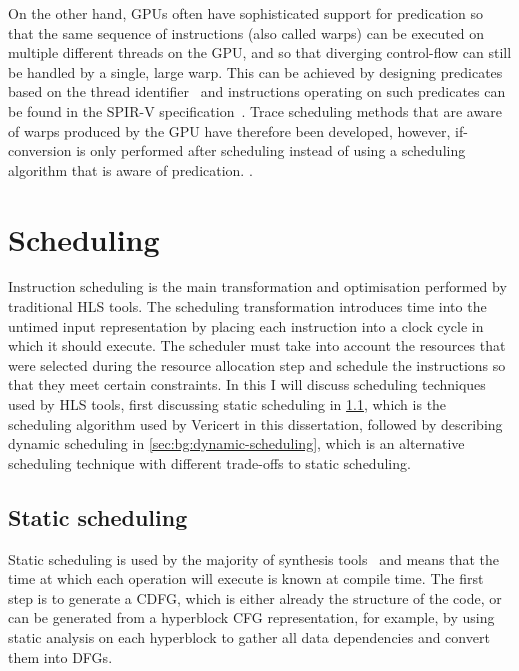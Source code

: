 On the other hand, \glspl{GPU} often have sophisticated support for predication so that the same sequence of instructions (also called warps) can be executed on multiple different threads on the \gls{GPU}, and so that diverging control-flow can still be handled by a single, large warp.
This can be achieved by designing predicates based on the thread identifier~\cite{narasiman11_igplw} and instructions operating on such predicates can be found in the SPIR-V specification~\cite[p.~172]{kessenich18_svs}.
Trace scheduling methods that are aware of warps produced by the \gls{GPU} have therefore been developed, however, if-conversion is only performed after scheduling instead of using a scheduling algorithm that is aware of predication.
.

\section{Scheduling}%
\label{sec:bg:scheduling}

Instruction scheduling is the main transformation and optimisation performed by
traditional \gls{HLS} tools.  The scheduling transformation introduces time into
the untimed input representation by placing each instruction into a clock cycle
in which it should execute.  The scheduler must take into account the resources
that were selected during the resource allocation step and schedule the
instructions so that they meet certain constraints.  In this
 I will discuss scheduling techniques used by
\gls{HLS} tools, first discussing static scheduling in
\cref{sec:bg:static-scheduling}, which is the scheduling algorithm used by
Vericert in this dissertation, followed by describing \gls{dynamic scheduling}
in \cref{sec:bg:dynamic-scheduling}, which is an alternative scheduling
technique with different trade-offs to static scheduling.

\subsection{Static scheduling}%
\label{sec:bg:static-scheduling}

Static scheduling is used by the majority of synthesis tools~\cite{canis13_l,
  amd23_vitis_high_synth, mentor20_catap_high_level_synth,
  intel20_sdk_openc_applic, roane23_autom_hw_sw_co_desig} and means that the
time at which each operation will execute is known at compile time.  The first
step is to generate a \gls{CDFG}, which is either already the structure of the
code, or can be generated from a \gls{hyperblock} \gls{CFG} representation, for
example, by using static analysis on each \gls{hyperblock} to gather all data
dependencies and convert them into \glspl{DFG}.

